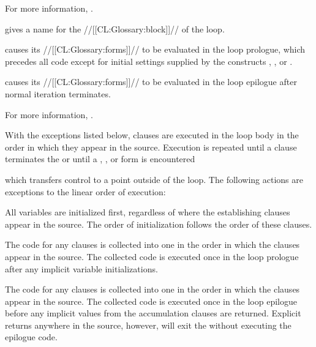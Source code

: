 For more information, \seesection\LOOPConditional.

\endsubsubsubsection%

 
 gives a name for the //[[CL:Glossary:block]]// of the loop.

 causes its //[[CL:Glossary:forms]]// to be
evaluated in the loop prologue, which precedes all  code
except for initial settings supplied by the constructs ,
, or .
 
 causes its //[[CL:Glossary:forms]]// to
be evaluated in the loop epilogue after normal iteration terminates.



For more information, \seesection\LOOPMisc.

\endsubsubsubsection%

\endsubsubsection%


 

  With the exceptions listed below, clauses are executed in the loop body
  in the order in which they appear in the source.  Execution is repeated 
  until a clause
  terminates the  or until a , ,
  or  form is encountered 

which transfers control to a point outside of the loop.
 The following actions are
  exceptions to the linear order of execution:
 
\beginlist

\itemitem{\bull}  All variables are initialized first, 
  regardless of where the establishing clauses appear in the
  source.  The order of initialization follows the order of these clauses.
                                    
\itemitem{\bull}  The code for any  clauses is collected
  into one  in the order in which the clauses appear in
  the source.  The collected code is executed once in the loop prologue
  after any implicit variable initializations.
 
\itemitem{\bull}    The code for any  clauses is collected 
  into one  in the order in which the clauses appear in
  the source.  The collected code is executed once in the loop epilogue
  before any implicit values from the accumulation clauses are returned.
  Explicit returns anywhere in the source, however, will exit the 
   without executing the epilogue code.
                     
